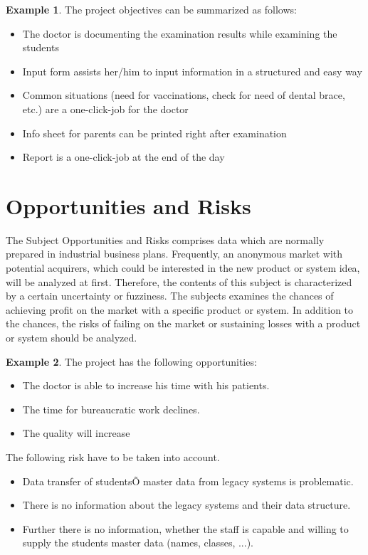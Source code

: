 \documentclass[12pt]{article}
\theoremstyle{definition}
\newtheorem{example}{Example}
\newenvironment{explanation}{%
   \setlength{\parindent}{0pt}
   \itshape
   \color{blue}
}{}
\begin{document}
\begin{example}
The project objectives can be summarized as follows:
\begin{itemize}
\item The doctor is documenting the examination results while examining the students
\item Input form assists her/him to input information in a structured and easy way
\item Common situations (need for vaccinations, check for need of dental brace, etc.) are a one-click-job for the doctor
\item Info sheet for parents can be printed right after examination
\item Report is a one-click-job at the end of the day
\end{itemize}
\end{example}

\pagebreak
\section{Opportunities and Risks}
\begin{explanation}
The Subject Opportunities and Risks comprises data which are normally prepared in industrial business plans. Frequently, an anonymous market with potential acquirers, which could be interested in the new product or system idea, will be analyzed at first. Therefore, the contents of this subject is characterized by a certain uncertainty or fuzziness. The subjects examines the chances of achieving profit on the market with a specific product or system. In addition to the chances, the risks of failing on the market or sustaining losses with a product or system should be analyzed.
\end{explanation}

\begin{example}
The project has the following opportunities:
\begin{itemize}
\item The doctor is able to increase his time with his patients.
\item The time for bureaucratic work declines.
\item The quality will increase
\end{itemize}

The following risk have to be taken into account.
\begin{itemize}
\item Data transfer of studentsÕ master data from legacy systems is problematic.
\item There is no information about the legacy systems and their data structure.
\item Further there is no information, whether the staff is capable and willing to supply the students master data (names, classes, ...).
\end{itemize}

\end{example}
\end{document}
